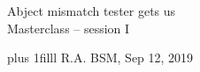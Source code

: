 \documentclass[onepage, 12pt]{beamer}
\author{RA}
\def\Bottom#1{\vskip 0pt plus 1filll #1}
\begin{document}


\begin{frame}[plain,t]
	\begin{center}
        \vspace{1cm}
		Abject mismatch tester gets us
		\\
		{\small\color{gray} Masterclass -- session I}

		\vspace{1cm}


	\end{center}

	\Bottom{
		\scriptsize
		R.A.
		\hfill
		BSM, Sep 12, 2019
		\\ {\ }
	}
\end{frame}


\end{document}
